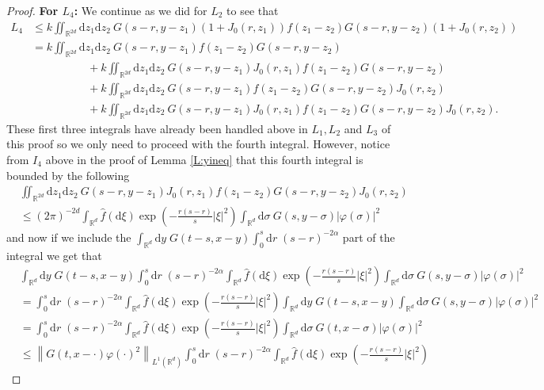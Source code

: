\documentclass[a4paper,11pt]{article}%
\numberwithin{equation}{section}
\theoremstyle{plain}
\theoremstyle{definition}
\newcommand{\R}{\mathbb{R}}
\newcommand{\Norm}[1]{\left\|  #1   \right\|}
\newcommand{\ud}{\ensuremath{ \mathrm{d} }}
\begin{document}
\begin{proof}
\noindent \textbf{For $L_4$:} We continue as we did for $L_2$ to see that
\begin{align*}
L_4 &\le k\iint_{\R^{2d}}\ud z_1 \ud z_2\:G(s-r,y-z_1)(1+J_0(r,z_1))f(z_1-z_2)G(s-r,y-z_2)(1+J_0(r,z_2))
\\&= k\iint_{\R^{2d}}\ud z_1 \ud z_2\:G(s-r,y-z_1)f(z_1-z_2)G(s-r,y-z_2)
\\&\hspace{5em}+k\iint_{\R^{2d}}\ud z_1 \ud z_2\:G(s-r,y-z_1)J_0(r,z_1)f(z_1-z_2)G(s-r,y-z_2)
\\&\hspace{5em}+ k\iint_{\R^{2d}}\ud z_1 \ud z_2\:G(s-r,y-z_1)f(z_1-z_2)G(s-r,y-z_2)J_0(r,z_2)
\\&\hspace{5em}+k\iint_{\R^{2d}}\ud z_1 \ud z_2\:G(s-r,y-z_1)J_0(r,z_1)f(z_1-z_2)G(s-r,y-z_2)J_0(r,z_2).
\end{align*}
These first three integrals have already been handled above in $L_1, L_2$ and $L_3$ of this proof so we only need to proceed with the fourth integral. However, notice from $I_4$ above in the proof of Lemma \ref{L:yineq} that this fourth integral is bounded by the following
\begin{align*}
&\iint_{\R^{2d}}\ud z_1 \ud z_2\:G(s-r,y-z_1)J_0(r,z_1)f(z_1-z_2)G(s-r,y-z_2)J_0(r,z_2)
\\ &\le (2\pi)^{-2d}\int_{\R^d} \hat{f}(\ud \xi)\exp\left(-\frac{r(s-r)}{s}|\xi|^2\right) \int_{\R^{d}}\ud \sigma\:G(s,y-\sigma)|\varphi(\sigma)|^2
\end{align*}
and now if we include the $\int_{\R^d}\ud y \;G(t-s,x-y)\int_0^s\ud r\; (s-r)^{-2\alpha}$ part of the integral we get that
\begin{align*}
&\int_{\R^d}\ud y \;G(t-s,x-y)\int_0^s\ud r\; (s-r)^{-2\alpha}\int_{\R^d} \hat{f}(\ud \xi)\exp\left(-\frac{r(s-r)}{s}|\xi|^2\right) \int_{\R^{d}}\ud \sigma\:G(s,y-\sigma)|\varphi(\sigma)|^2
\\&= \int_0^s\ud r\; (s-r)^{-2\alpha}\int_{\R^d} \hat{f}(\ud \xi)\exp\left(-\frac{r(s-r)}{s}|\xi|^2\right)\int_{\R^d}\ud y \;G(t-s,x-y) \int_{\R^{d}}\ud \sigma\:G(s,y-\sigma)|\varphi(\sigma)|^2
\\&= \int_0^s\ud r\; (s-r)^{-2\alpha}\int_{\R^d} \hat{f}(\ud \xi)\exp\left(-\frac{r(s-r)}{s}|\xi|^2\right)\int_{\R^{d}}\ud \sigma\:G(t,x-\sigma)|\varphi(\sigma)|^2
\\&\le \Norm{G(t,x-\cdot)\varphi(\cdot)^2}_{L^1(\R^d)} \int_0^s\ud r\; (s-r)^{-2\alpha}\int_{\R^d} \hat{f}(\ud \xi)\exp\left(-\frac{r(s-r)}{s}|\xi|^2\right)
\end{align*}

\end{proof}
\end{document}
